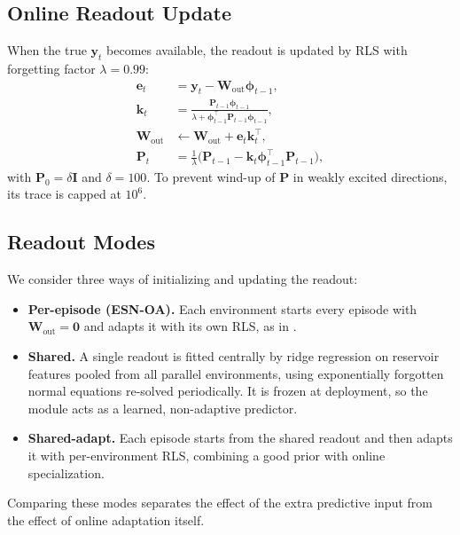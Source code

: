 \subsection{Online Readout Update}
\noindent
When the true $\mathbf{y}_{t}$ becomes available, the readout is updated by RLS with forgetting factor $\lambda = 0.99$:
\begin{align}
    \mathbf{e}_t            & = \mathbf{y}_t - \mathbf{W}_{\text{out}} \boldsymbol{\phi}_{t-1},                                                                   \\
    \mathbf{k}_t            & = \frac{\mathbf{P}_{t-1} \boldsymbol{\phi}_{t-1}}{\lambda + \boldsymbol{\phi}_{t-1}^\top \mathbf{P}_{t-1} \boldsymbol{\phi}_{t-1}}, \\
    \mathbf{W}_{\text{out}} & \leftarrow \mathbf{W}_{\text{out}} + \mathbf{e}_t \mathbf{k}_t^\top,                                                                \\
    \mathbf{P}_t            & = \frac{1}{\lambda}\big(\mathbf{P}_{t-1} - \mathbf{k}_t \boldsymbol{\phi}_{t-1}^\top \mathbf{P}_{t-1}\big),
\end{align}
with $\mathbf{P}_0 = \delta \mathbf{I}$ and $\delta = 100$. To prevent wind-up of $\mathbf{P}$ in weakly excited directions, its trace is capped at $10^6$.

\subsection{Readout Modes}
\noindent
We consider three ways of initializing and updating the readout:
\begin{itemize}
    \item \textbf{Per-episode (ESN-OA).} Each environment starts every episode with $\mathbf{W}_{\text{out}} = \mathbf{0}$ and adapts it with its own RLS, as in \cite{yoshimuraOnlineAdaptiveReinforcement2026}.
    \item \textbf{Shared.} A single readout is fitted centrally by ridge regression on reservoir features pooled from all parallel environments, using exponentially forgotten normal equations re-solved periodically. It is frozen at deployment, so the module acts as a learned, non-adaptive predictor.
    \item \textbf{Shared-adapt.} Each episode starts from the shared readout and then adapts it with per-environment RLS, combining a good prior with online specialization.
\end{itemize}
Comparing these modes separates the effect of the extra predictive input from the effect of online adaptation itself.
